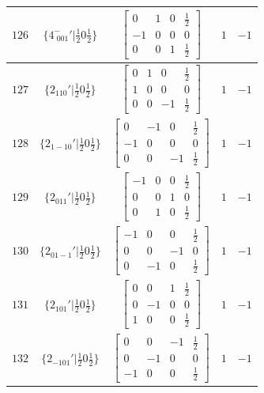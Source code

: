\documentclass[fleqn,8pt]{jsarticle}
\begin{document}
\begin{longtable}{ccccc}
$ 126 $ & $ \{4^{-}_{\,\,001}{}'|\frac{1}{2} 0 \frac{1}{2}\} $ & $ \begin{bmatrix} 0 & 1 & 0 & \frac{1}{2} \\ -1 & 0 & 0 & 0 \\ 0 & 0 & 1 & \frac{1}{2} \end{bmatrix} $ & $ 1 $ & $ -1 $ \\ \hline
$ 127 $ & $ \{2{}_{110}{}'|\frac{1}{2} 0 \frac{1}{2}\} $ & $ \begin{bmatrix} 0 & 1 & 0 & \frac{1}{2} \\ 1 & 0 & 0 & 0 \\ 0 & 0 & -1 & \frac{1}{2} \end{bmatrix} $ & $ 1 $ & $ -1 $ \\ \hline
$ 128 $ & $ \{2{}_{1-10}{}'|\frac{1}{2} 0 \frac{1}{2}\} $ & $ \begin{bmatrix} 0 & -1 & 0 & \frac{1}{2} \\ -1 & 0 & 0 & 0 \\ 0 & 0 & -1 & \frac{1}{2} \end{bmatrix} $ & $ 1 $ & $ -1 $ \\ \hline
$ 129 $ & $ \{2{}_{011}{}'|\frac{1}{2} 0 \frac{1}{2}\} $ & $ \begin{bmatrix} -1 & 0 & 0 & \frac{1}{2} \\ 0 & 0 & 1 & 0 \\ 0 & 1 & 0 & \frac{1}{2} \end{bmatrix} $ & $ 1 $ & $ -1 $ \\ \hline
$ 130 $ & $ \{2{}_{01-1}{}'|\frac{1}{2} 0 \frac{1}{2}\} $ & $ \begin{bmatrix} -1 & 0 & 0 & \frac{1}{2} \\ 0 & 0 & -1 & 0 \\ 0 & -1 & 0 & \frac{1}{2} \end{bmatrix} $ & $ 1 $ & $ -1 $ \\ \hline
$ 131 $ & $ \{2{}_{101}{}'|\frac{1}{2} 0 \frac{1}{2}\} $ & $ \begin{bmatrix} 0 & 0 & 1 & \frac{1}{2} \\ 0 & -1 & 0 & 0 \\ 1 & 0 & 0 & \frac{1}{2} \end{bmatrix} $ & $ 1 $ & $ -1 $ \\ \hline
$ 132 $ & $ \{2{}_{-101}{}'|\frac{1}{2} 0 \frac{1}{2}\} $ & $ \begin{bmatrix} 0 & 0 & -1 & \frac{1}{2} \\ 0 & -1 & 0 & 0 \\ -1 & 0 & 0 & \frac{1}{2} \end{bmatrix} $ & $ 1 $ & $ -1 $ \\ \hline

\end{longtable}
\end{document}
